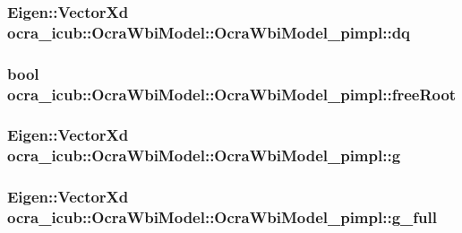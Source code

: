 \hypertarget{structOcraWbiModel_1_1OcraWbiModel__pimpl_a6584a086fe050dab90cd4f0a0e7e970d}{
\subsubsection[{dq}]{\setlength{\rightskip}{0pt plus 5cm}\-Eigen\-::\-Vector\-Xd {\bf ocra\-\_\-icub\-::\-Ocra\-Wbi\-Model\-::\-Ocra\-Wbi\-Model\-\_\-pimpl\-::dq}}}\label{structOcraWbiModel_1_1OcraWbiModel__pimpl_a6584a086fe050dab90cd4f0a0e7e970d}
\hypertarget{structOcraWbiModel_1_1OcraWbiModel__pimpl_ac779ed6d908a6e1773ce4be340bd8182}{
\subsubsection[{free\-Root}]{\setlength{\rightskip}{0pt plus 5cm}bool {\bf ocra\-\_\-icub\-::\-Ocra\-Wbi\-Model\-::\-Ocra\-Wbi\-Model\-\_\-pimpl\-::free\-Root}}}\label{structOcraWbiModel_1_1OcraWbiModel__pimpl_ac779ed6d908a6e1773ce4be340bd8182}
\hypertarget{structOcraWbiModel_1_1OcraWbiModel__pimpl_ac9a96e0afe19e395bfadf4a21b6d0f5b}{
\subsubsection[{g}]{\setlength{\rightskip}{0pt plus 5cm}\-Eigen\-::\-Vector\-Xd {\bf ocra\-\_\-icub\-::\-Ocra\-Wbi\-Model\-::\-Ocra\-Wbi\-Model\-\_\-pimpl\-::g}}}\label{structOcraWbiModel_1_1OcraWbiModel__pimpl_ac9a96e0afe19e395bfadf4a21b6d0f5b}
\hypertarget{structOcraWbiModel_1_1OcraWbiModel__pimpl_a76adc7eb17d82f9234a4f130c2712be5}{
\subsubsection[{g\-\_\-full}]{\setlength{\rightskip}{0pt plus 5cm}\-Eigen\-::\-Vector\-Xd {\bf ocra\-\_\-icub\-::\-Ocra\-Wbi\-Model\-::\-Ocra\-Wbi\-Model\-\_\-pimpl\-::g\-\_\-full}}}\label{structOcraWbiModel_1_1OcraWbiModel__pimpl_a76adc7eb17d82f9234a4f130c2712be5}
